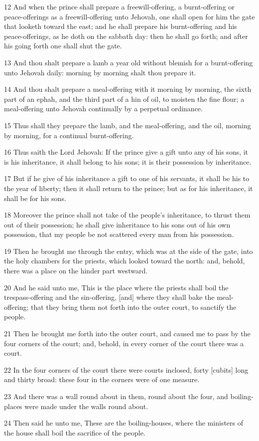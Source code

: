 \par 12 And when the prince shall prepare a freewill-offering, a burnt-offering or peace-offerings as a freewill-offering unto Jehovah, one shall open for him the gate that looketh toward the east; and he shall prepare his burnt-offering and his peace-offerings, as he doth on the sabbath day: then he shall go forth; and after his going forth one shall shut the gate.
\par 13 And thou shalt prepare a lamb a year old without blemish for a burnt-offering unto Jehovah daily: morning by morning shalt thou prepare it.
\par 14 And thou shalt prepare a meal-offering with it morning by morning, the sixth part of an ephah, and the third part of a hin of oil, to moisten the fine flour; a meal-offering unto Jehovah continually by a perpetual ordinance.
\par 15 Thus shall they prepare the lamb, and the meal-offering, and the oil, morning by morning, for a continual burnt-offering.
\par 16 Thus saith the Lord Jehovah: If the prince give a gift unto any of his sons, it is his inheritance, it shall belong to his sons; it is their possession by inheritance.
\par 17 But if he give of his inheritance a gift to one of his servants, it shall be his to the year of liberty; then it shall return to the prince; but as for his inheritance, it shall be for his sons.
\par 18 Moreover the prince shall not take of the people's inheritance, to thrust them out of their possession; he shall give inheritance to his sons out of his own possession, that my people be not scattered every man from his possession.
\par 19 Then he brought me through the entry, which was at the side of the gate, into the holy chambers for the priests, which looked toward the north: and, behold, there was a place on the hinder part westward.
\par 20 And he said unto me, This is the place where the priests shall boil the trespass-offering and the sin-offering, [and] where they shall bake the meal-offering; that they bring them not forth into the outer court, to sanctify the people.
\par 21 Then he brought me forth into the outer court, and caused me to pass by the four corners of the court; and, behold, in every corner of the court there was a court.
\par 22 In the four corners of the court there were courts inclosed, forty [cubits] long and thirty broad: these four in the corners were of one measure.
\par 23 And there was a wall round about in them, round about the four, and boiling-places were made under the walls round about.
\par 24 Then said he unto me, These are the boiling-houses, where the ministers of the house shall boil the sacrifice of the people.


